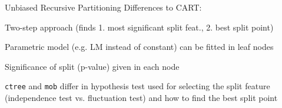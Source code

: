 \documentclass[10pt,compress,t,notes=noshow, xcolor=table]{beamer}
\begin{document}
\begin{framev}[align=top]{Unbiased Recursive Partitioning}
Differences to CART:
\begin{itemizeM}
\item Two-step approach (finds 1. most significant split feat., 2. best split point)
\item Parametric model (e.g. LM instead of constant) can be fitted in leaf nodes %
\item Significance of split (p-value) given in each node
\item \texttt{ctree} and \texttt{mob} differ in hypothesis test used for selecting the split feature (independence test vs. fluctuation test) and how to find the best split point
\end{itemizeM}
\spacer[0.25]
\end{framev}




\end{document}
